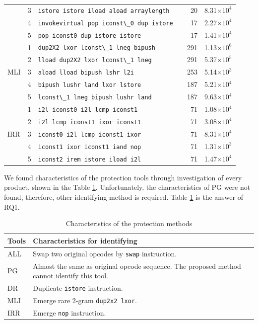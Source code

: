 \documentclass[conference]{IEEEtran}
\begin{document}
\begin{table}[t]
{\begin{tabular}{lc|l|r|r}
& 3 & \verb!istore istore iload aload arraylength ! & 20 & 8.31$\times10^4$ \\
& 4 & \verb!invokevirtual pop iconst\_0 dup istore  ! & 17 & 2.27$\times10^4$ \\
& 5 & \verb!pop iconst0 dup istore istore         ! & 17 & 1.41$\times10^4$ \\ \hline
\multirow{5}{*}{{MLI}}
& 1 & \verb!dup2X2 lxor lconst\_1 lneg bipush ! & 291 & 1.13$\times10^6$ \\
& 2 & \verb!lload dup2X2 lxor lconst\_1 lneg  ! & 291 & 5.37$\times10^5$ \\
& 3 & \verb!aload lload bipush lshr l2i     ! & 253 & 5.14$\times10^3$ \\
& 4 & \verb!bipush lushr land lxor lstore   ! & 187 & 5.21$\times10^4$ \\
& 5 & \verb!lconst\_1 lneg bipush lushr land  ! & 187 & 9.63$\times10^4$ \\ \hline
\multirow{5}{*}{{IRR}}
& 1 & \verb!i2l iconst0 i2l lcmp iconst1  ! & 71 & 1.08$\times10^4$ \\
& 2 & \verb!i2l lcmp iconst1 ixor iconst1 ! & 71 & 3.08$\times10^4$ \\
& 3 & \verb!iconst0 i2l lcmp iconst1 ixor ! & 71 & 8.31$\times10^4$ \\
& 4 & \verb!iconst1 ixor iconst1 iand nop ! & 71 & 1.31$\times10^3$ \\
& 5 & \verb!iconst2 irem istore iload i2l ! & 71 & 1.47$\times10^4$ \\
  \end{tabular}}
\end{table}

We found characteristics of the protection tools through investigation
of every product, shown in the Table \ref{table:characteristics}.
Unfortunately, the characteristics of PG were not found, therefore, other
identifying method is required.  Table \ref{table:characteristics} is
the answer of RQ1.

\begin{table}[t]
  \centering
  \footnotesize{
    \caption{Characteristics of the protection methods}\label{table:characteristics}
  \begin{tabular}{l|p{6.5cm}}
    \textbf{Tools} & \textbf{Characteristics for identifying} \\ \hline
    ALL  & Swap two original opcodes by \texttt{swap} instruction. \\
    PG   & Almost the same as original opcode sequence.  The proposed method cannot identify this tool. \\
    DR   & Duplicate \texttt{istore} instruction. \\
    MLI  & Emerge rare 2-gram \texttt{dup2x2 lxor}. \\
    IRR  & Emerge \texttt{nop} instruction. \\
  \end{tabular}}
\end{table}
\end{document}
